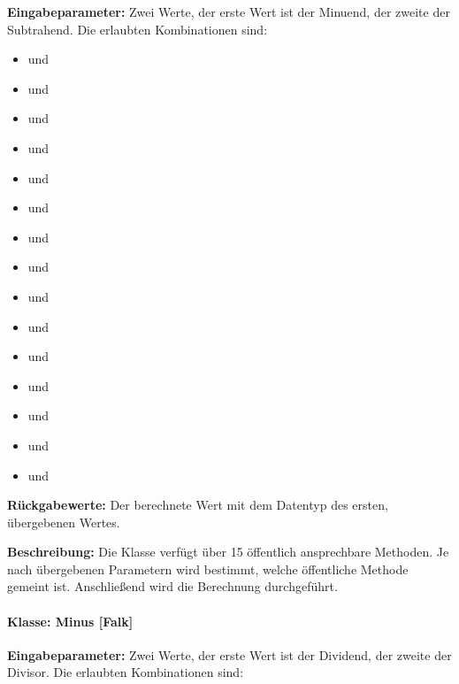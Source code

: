 \textbf{Eingabeparameter: }Zwei Werte, der erste Wert ist der Minuend, der zweite der Subtrahend. Die erlaubten Kombinationen sind: 

\begin{itemize}
	\item {} und  
	\item {} und 
	\item {} und  
	\item {} und 
	\item {} und 
	\item {} und 
	\item {} und 
	\item {} und 
	\item {} und 
	\item {} und 
	\item {} und 
	\item {} und 
	\item {} und 
	\item {} und 
	\item {} und 
\end{itemize} 

\textbf{Rückgabewerte: }Der berechnete Wert mit dem Datentyp des ersten, übergebenen Wertes. 

\textbf{Beschreibung: }Die Klasse verfügt über 15 öffentlich ansprechbare Methoden. Je nach übergebenen Parametern wird bestimmt, welche öffentliche Methode gemeint ist. Anschließend wird die Berechnung durchgeführt. 

\paragraph{Klasse: Minus [Falk]}

\textbf{Eingabeparameter: }Zwei Werte, der erste Wert ist der Dividend, der zweite der Divisor. Die erlaubten Kombinationen sind: 

